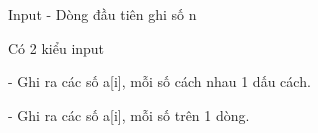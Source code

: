 Input
- Dòng đầu tiên ghi số n

Có 2 kiểu input

- Ghi ra các số a[i], mỗi số cách nhau 1 dấu cách.

- Ghi ra các số a[i], mỗi số trên 1 dòng.